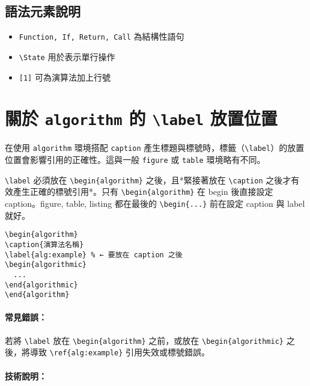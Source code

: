 \subsection*{語法元素說明}

\begin{itemize}
\item \texttt{Function, If, Return, Call} 為結構性語句
\item \texttt{\textbackslash State} 用於表示單行操作
\item \texttt{[1]} 可為演算法加上行號
\end{itemize}

\section{關於 \texttt{algorithm} 的 \texttt{\textbackslash label} 放置位置}

在使用 \texttt{algorithm} 環境搭配 \texttt{caption} 產生標題與標號時，標籤（\verb|\label|）的放置位置會影響引用的正確性。這與一般 \texttt{figure} 或 \texttt{table} 環境略有不同。

\texttt{\textbackslash label} 必須放在 \texttt{\textbackslash begin\{algorithm\}} 之後，且*緊接著放在 \texttt{\textbackslash caption} 之後才有效產生正確的標號引用*。只有 \texttt{\textbackslash begin\{algorithm\}} 在 begin 後直接設定 caption。figure, table, listing 都在最後的 \texttt{\textbackslash begin\{...\}} 前在設定 caption 與 label 就好。

\begin{verbatim}
\begin{algorithm}
\caption{演算法名稱}
\label{alg:example} % ← 要放在 caption 之後
\begin{algorithmic}
  ...
\end{algorithmic}
\end{algorithm}
\end{verbatim}

\paragraph{常見錯誤：}

若將 \verb|\label| 放在 \verb|\begin{algorithm}| 之前，或放在 \verb|\begin{algorithmic}| 之後，將導致 \verb|\ref{alg:example}| 引用失效或標號錯誤。

\paragraph{技術說明：}

